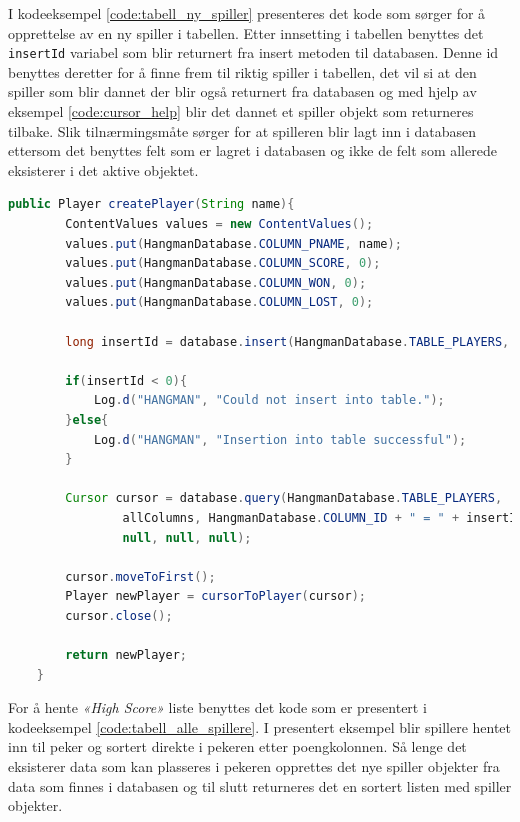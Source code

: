 I kodeeksempel \ref{code:tabell_ny_spiller} presenteres det kode som sørger for å opprettelse av en ny spiller i tabellen. Etter innsetting i tabellen benyttes det \texttt{insertId} variabel som blir returnert fra insert metoden til databasen. Denne id benyttes deretter for å finne frem til riktig spiller i tabellen, det vil si at den spiller som blir dannet der blir også returnert fra databasen og med hjelp av eksempel \ref{code:cursor_help} blir det dannet et spiller objekt som returneres tilbake. Slik tilnærmingsmåte sørger for at spilleren blir lagt inn i databasen ettersom det benyttes felt som er lagret i databasen og ikke de felt som allerede eksisterer i det aktive objektet.

\begin{lstlisting}[language=Java, caption=Metode for oppretting av en ny spiller i tabellen, label=code:tabell_ny_spiller]
public Player createPlayer(String name){
        ContentValues values = new ContentValues();
        values.put(HangmanDatabase.COLUMN_PNAME, name);
        values.put(HangmanDatabase.COLUMN_SCORE, 0);
        values.put(HangmanDatabase.COLUMN_WON, 0);
        values.put(HangmanDatabase.COLUMN_LOST, 0);

        long insertId = database.insert(HangmanDatabase.TABLE_PLAYERS, null, values);

        if(insertId < 0){
            Log.d("HANGMAN", "Could not insert into table.");
        }else{
            Log.d("HANGMAN", "Insertion into table successful");
        }

        Cursor cursor = database.query(HangmanDatabase.TABLE_PLAYERS,
                allColumns, HangmanDatabase.COLUMN_ID + " = " + insertId, null,
                null, null, null);

        cursor.moveToFirst();
        Player newPlayer = cursorToPlayer(cursor);
        cursor.close();

        return newPlayer;
    }
\end{lstlisting}

For å hente \textit{«High Score»} liste benyttes det kode som er presentert i kodeeksempel \ref{code:tabell_alle_spillere}. I presentert eksempel blir spillere hentet inn til peker og sortert direkte i pekeren etter poengkolonnen. Så lenge det eksisterer data som kan plasseres i pekeren opprettes det nye spiller objekter fra data som finnes i databasen og til slutt returneres det en sortert listen med spiller objekter.

